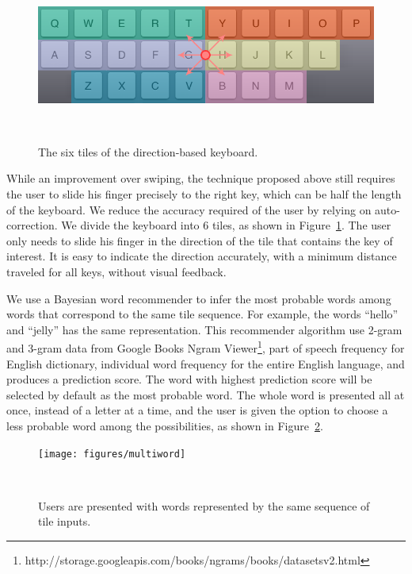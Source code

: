 \begin{figure}
  \centering

  \includegraphics[width=1\columnwidth]{figures/arrows}
  
  \caption{The six tiles of the direction-based keyboard.}
  ~\label{fig:swipeVRLayout}
\end{figure}

While an improvement over swiping, the technique proposed above still requires the user to slide his finger precisely to the right key, which can be half the length of the keyboard.  We reduce the accuracy required of the user by relying on auto-correction.  We divide the keyboard into 6 tiles, as shown in Figure~\ref{fig:swipeVRLayout}.   The user only needs to slide his finger in the direction of the tile that contains the key of interest.  It is easy to indicate the direction accurately, with a minimum distance traveled for all keys, without visual feedback. 

We use a Bayesian word recommender to infer the most probable words among words that correspond to the same tile sequence.  For example, the words ``hello'' and ``jelly'' has the same representation.  
This recommender algorithm use 2-gram and 3-gram data from Google Books Ngram Viewer\footnote{http://storage.googleapis.com/books/ngrams/books/datasetsv2.html}, part of speech frequency for English dictionary, individual word frequency for the entire English language, and produces a prediction score.
The word with highest prediction score will be selected by default as the most probable word.  
The whole word is presented all at once, instead of a letter at a time, and the user is given the option to choose a less probable word among the possibilities, as shown in Figure~\ref{fig:multiword}.  


\begin{figure}
  \centering

  \texttt{[image: figures/multiword]}
  
  \caption{Users are presented with words represented by the same sequence of tile inputs.}
  ~\label{fig:multiword}
\end{figure}

